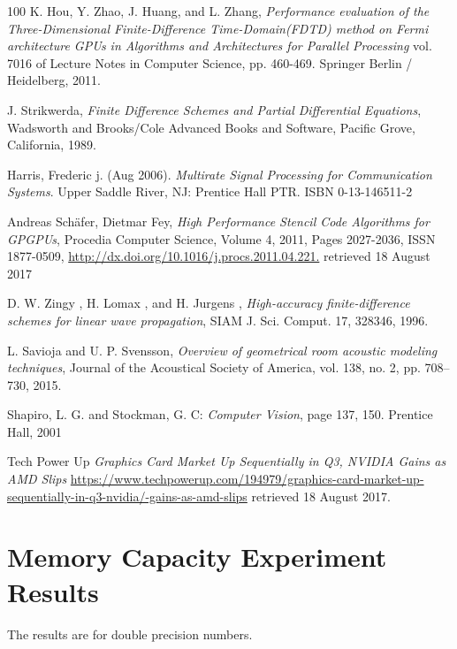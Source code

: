 \documentclass[12pt,a4paper]{report}
\begin{document}
\begin{thebibliography}{100}
 K. Hou, Y. Zhao, J. Huang, and L. Zhang, \emph{Performance evaluation of the Three-Dimensional Finite-Difference Time-Domain(FDTD) method on Fermi architecture GPUs in Algorithms and Architectures for Parallel Processing} vol. 7016 of Lecture Notes in Computer Science, pp. 460-469. Springer Berlin
/ Heidelberg, 2011.

 J. Strikwerda, \emph{Finite Difference Schemes and Partial Differential Equations}, Wadsworth and Brooks/Cole Advanced Books and Software, Pacific Grove, California, 1989.

 Harris, Frederic j. (Aug 2006). \emph{Multirate Signal Processing for Communication Systems}. Upper Saddle River, NJ: Prentice Hall PTR. ISBN 0-13-146511-2



Andreas Sch\"{a}fer, Dietmar Fey, \emph{High Performance Stencil Code Algorithms for GPGPUs}, Procedia Computer Science, Volume 4, 2011, Pages 2027-2036, ISSN 1877-0509, \url{http://dx.doi.org/10.1016/j.procs.2011.04.221.} retrieved 18 August 2017


D. W. Zingy , H. Lomax , and H. Jurgens , \emph{High-accuracy finite-difference schemes for linear wave propagation}, SIAM J. Sci. Comput. 17, 328346, 1996.

L. Savioja and U. P. Svensson, \emph{Overview of geometrical room acoustic modeling techniques}, Journal of the Acoustical Society of America, vol. 138, no. 2, pp. 708--730, 2015.

Shapiro, L. G. and Stockman, G. C: \emph{Computer Vision}, page 137, 150. Prentice Hall, 2001

 Tech Power Up {\em Graphics Card Market Up Sequentially in Q3, NVIDIA Gains as AMD Slips} \url{https://www.techpowerup.com/194979/graphics-card-market-up-sequentially-in-q3-nvidia/-gains-as-amd-slips} retrieved 18 August 2017.

\end{thebibliography}

\appendix
\chapter{Memory Capacity Experiment Results}
\label{appendix:mem-cap}
The results are for double precision numbers.

\begin{table}[H]
\caption{Sphere memory capacity results}
\end{table}
\end{document}

